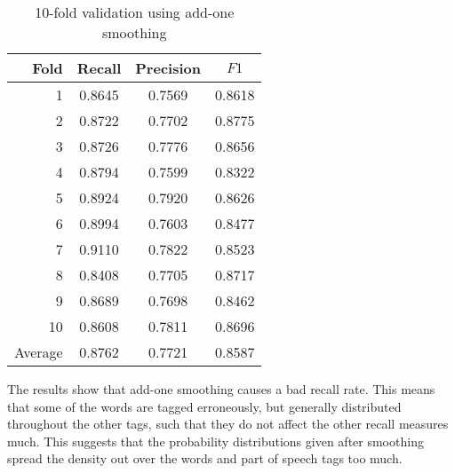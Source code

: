 \documentclass[12pt]{homework}
\begin{document}
\begin{table}
	\begin{center}
	\begin{tabular}{r | c c c}
	\hline
	Fold	&	Recall	&	Precision& $F1$ \\
	\hline
	1	 &	0.8645	&	0.7569	&	0.8618\\
	2	 &	0.8722	&	0.7702	&	0.8775\\
	3	 &	0.8726	&	0.7776	&	0.8656\\
	4	 &	0.8794	&	0.7599	&	0.8322\\
	5	 &	0.8924	&	0.7920	&	0.8626\\
	6	 &	0.8994	&	0.7603	&	0.8477\\
	7	 &	0.9110	&	0.7822	&	0.8523\\
	8	 &	0.8408	&	0.7705	&	0.8717\\
	9	 &	0.8689	&	0.7698	&	0.8462\\
	10	 &	0.8608	&	0.7811	&	0.8696\\
	\hline
Average	 &	0.8762	&	0.7721	&	0.8587\\
	\hline
	\end{tabular}
	\end{center}
	\caption{10-fold validation using add-one smoothing}
	\label{addoneresult}
\end{table}
The results show that add-one smoothing causes a bad recall rate. This means 
that some of the words are tagged erroneously, but generally distributed 
throughout the other tags, such that they do not affect the other recall 
measures much. This suggests that the probability distributions given after 
smoothing spread the density out over the words and part of speech tags too 
much.
\end{document}
